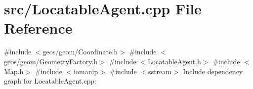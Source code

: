 \section{src/\+Locatable\+Agent.cpp File Reference}
\label{_locatable_agent_8cpp}
{\ttfamily \#include $<$geos/geom/\+Coordinate.\+h$>$}\newline
{\ttfamily \#include $<$geos/geom/\+Geometry\+Factory.\+h$>$}\newline
{\ttfamily \#include $<$Locatable\+Agent.\+h$>$}\newline
{\ttfamily \#include $<$Map.\+h$>$}\newline
{\ttfamily \#include $<$iomanip$>$}\newline
{\ttfamily \#include $<$sstream$>$}\newline
Include dependency graph for Locatable\+Agent.\+cpp\+:
